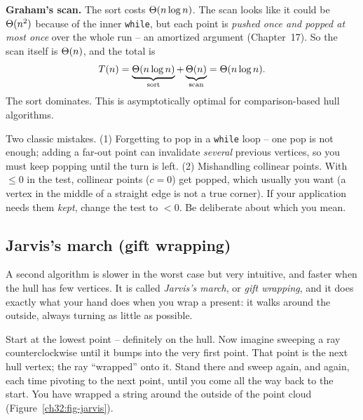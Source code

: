 \begin{complexitybox}
\textbf{Graham's scan.} The sort costs $\Theta(n \log n)$. The scan looks like it
could be $\Theta(n^2)$ because of the inner \texttt{while}, but each point is
\emph{pushed once and popped at most once} over the whole run -- an amortized
argument (Chapter~17). So the scan itself is $\Theta(n)$, and the total is
\[
  T(n) = \underbrace{\Theta(n \log n)}_{\text{sort}} + \underbrace{\Theta(n)}_{\text{scan}}
       = \Theta(n \log n).
\]
The sort dominates. This is asymptotically optimal for comparison-based hull
algorithms.
\end{complexitybox}

\begin{trapbox}
Two classic mistakes. (1) Forgetting to pop in a \texttt{while} loop -- one pop is
not enough; adding a far-out point can invalidate \emph{several} previous
vertices, so you must keep popping until the turn is left. (2) Mishandling
collinear points. With $\le 0$ in the test, collinear points ($c=0$) get popped,
which usually you want (a vertex in the middle of a straight edge is not a true
corner). If your application needs them \emph{kept}, change the test to $<0$. Be
deliberate about which you mean.
\end{trapbox}

\subsection{Jarvis's march (gift wrapping)}

A second algorithm is slower in the worst case but very intuitive, and faster
when the hull has few vertices. It is called \emph{Jarvis's march}, or \emph{gift
wrapping}, and it does exactly what your hand does when you wrap a present: it
walks around the outside, always turning as little as possible.

\begin{intuitionbox}
Start at the lowest point -- definitely on the hull. Now imagine sweeping a ray
counterclockwise until it bumps into the very first point. That point is the next
hull vertex; the ray ``wrapped'' onto it. Stand there and sweep again, and again,
each time pivoting to the next point, until you come all the way back to the
start. You have wrapped a string around the outside of the point cloud (Figure~\ref{ch32:fig-jarvis}).
\end{intuitionbox}

